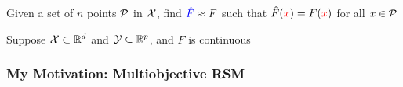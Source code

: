 \documentclass[aspectratio=169]{beamer}
\begin{document}
\begin{frame}
\pause
\bigskip

{\large Given a set of $n$ points {\color{red} ${\cal P}$} in ${\cal X}$,
find
${\color{blue} {\hat F}} \approx F$ such that ${\hat F}({\color{red} x}) = F({\color{red} x})$ for all
{\color{red}$x\in{\cal P}$}}

\pause
\bigskip

{\large Suppose ${\cal X} \subset \mathbb{R}^d$ and
${\cal Y} \subset \mathbb{R}^p$, and $F$ is continuous
}

\end{frame}

\begin{frame}\frametitle{My Motivation: Multiobjective RSM}
\begin{columns}
\begin{column}{0.4\textwidth}
\begin{center}
\medskip
\vskip 0.5cm
\medskip
{}
\end{center}
\end{column}
\begin{column}{0.2\textwidth}
\begin{center}
\\

\end{center}
\end{column}
\end{columns}
\end{frame}
\end{document}
